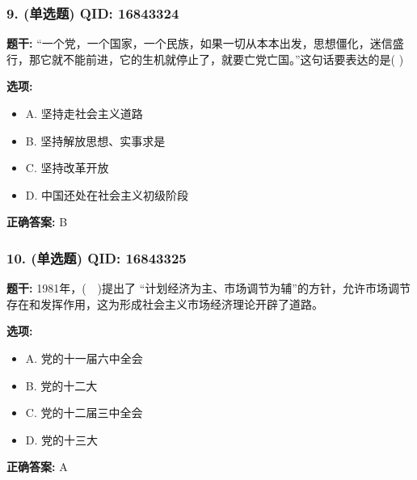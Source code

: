 \documentclass[12pt,UTF8]{ctexart}
\begin{document}
\subsubsection*{9. (单选题) \small QID: 16843324}

\textbf{题干:}
“一个党，一个国家，一个民族，如果一切从本本出发，思想僵化，迷信盛行，那它就不能前进，它的生机就停止了，就要亡党亡国。”这句话要表达的是( )

\textbf{选项:}
\begin{itemize}[leftmargin=*]

  \item A. 坚持走社会主义道路

  \item B. 坚持解放思想、实事求是

  \item C. 坚持改革开放

  \item D. 中国还处在社会主义初级阶段

\end{itemize}

\textbf{正确答案:}
B

\vspace{0.3em}\hrulefill\vspace{0.7em}

\subsubsection*{10. (单选题) \small QID: 16843325}

\textbf{题干:}
1981年，(  )提出了 “计划经济为主、市场调节为辅”的方针，允许市场调节存在和发挥作用，这为形成社会主义市场经济理论开辟了道路。

\textbf{选项:}
\begin{itemize}[leftmargin=*]

  \item A. 党的十一届六中全会

  \item B. 党的十二大

  \item C. 党的十二届三中全会

  \item D. 党的十三大

\end{itemize}

\textbf{正确答案:}
A

\vspace{0.3em}\hrulefill\vspace{0.7em}
\end{document}
